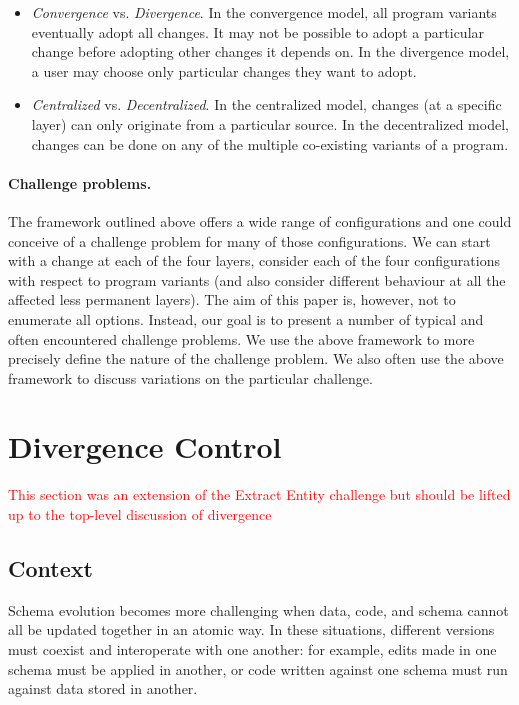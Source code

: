 \documentclass[english,submission]{programming}
\begin{document}
\begin{itemize}
\item \emph{Convergence} vs. \emph{Divergence}. In the convergence model, all program variants
  eventually adopt all changes. It may not be possible to adopt a particular change before adopting
  other changes it depends on. In the divergence model, a user may choose only particular changes
  they want to adopt.
\item \emph{Centralized} vs. \emph{Decentralized}. In the centralized model, changes (at a
  specific layer) can only originate from a particular source. In the decentralized model,
  changes can be done on any of the multiple co-existing variants of a program.
\end{itemize}

\paragraph{Challenge problems.}
The framework outlined above offers a wide range of configurations and one could conceive of
a challenge problem for many of those configurations. We can start with a change at each of the
four layers, consider each of the four configurations with respect to program variants (and also
consider different behaviour at all the affected less permanent layers). The aim of this paper
is, however, not to enumerate all options. Instead, our goal is to present a number of typical
and often encountered challenge problems. We use the above framework to more precisely define
the nature of the challenge problem. We also often use the above framework to discuss variations
on the particular challenge.


\section{Divergence Control}

\textcolor{red}{This section was an extension of the Extract Entity challenge but should be lifted up to the top-level discussion of divergence}

\subsection{Context}
Schema evolution becomes more challenging when data, code, and schema cannot all be updated together in an atomic way. In these situations, different versions must coexist and interoperate with one another: for example, edits made in one schema must be applied in another, or code written against one schema must run against data stored in another.
\end{document}
